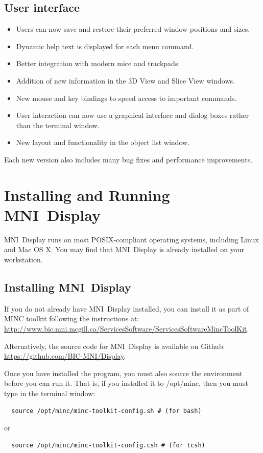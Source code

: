 \documentclass[11pt,letterpaper]{article}
\newcommand{\display}{\mbox{MNI Display}}
\begin{document}
\subsection{User interface}
\begin{itemize}
\item Users can now save and restore their preferred window positions and sizes.
\item Dynamic help text is displayed for each menu command.
\item Better integration with modern mice and trackpads.
\item Addition of new information in the 3D View and Slice View windows.
\item New mouse and key bindings to speed access to important commands.
\item User interaction can now use a graphical interface and dialog
  boxes rather than the terminal window.
\item New layout and functionality in the object list window.
\end{itemize}

Each new version also includes many bug fixes and performance improvements.

\section{Installing and Running \display{}}

\display{} runs on most POSIX-compliant operating systems, including Linux
and Mac OS X. You may find that \display{} is already installed on your workstation.

\subsection{Installing \display{}}
If you do not already have \display{} installed, you can install it as
part of MINC toolkit following the instructions at:
\url{http://www.bic.mni.mcgill.ca/ServicesSoftware/ServicesSoftwareMincToolKit}.

Alternatively, the source code for \display{} is available on Github:
\url{https://github.com/BIC-MNI/Display}.

Once you have installed the program, you must also source the
environment before you can run it.  That is, if you installed it to
/opt/minc, then you must type in the terminal window:
\begin{verbatim}
  source /opt/minc/minc-toolkit-config.sh # (for bash)
\end{verbatim}
or
\begin{verbatim}
  source /opt/minc/minc-toolkit-config.csh # (for tcsh)
\end{verbatim}
\end{document}
